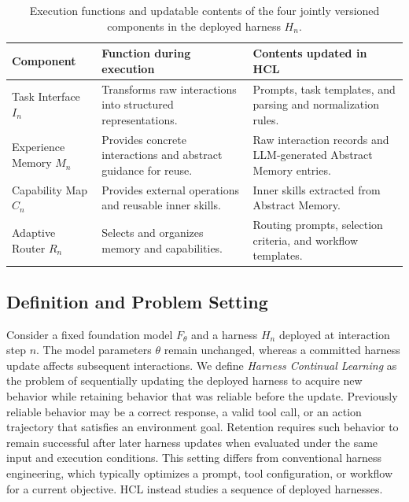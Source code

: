 \documentclass{article}
\begin{document}
\begin{table}[t]
\centering
\footnotesize
\caption{
Execution functions and updatable contents of the four jointly versioned
components in the deployed harness $H_n$.
}
\label{tab:hcl_state_overview}

\setlength{\tabcolsep}{3pt}
\renewcommand{\arraystretch}{0.98}

\begin{tabular}{
    >{\raggedright\arraybackslash}p{}
    >{\raggedright\arraybackslash}p{}
    >{\raggedright\arraybackslash}p{}
}
\toprule
Component
& Function during execution
& Contents updated in HCL \\
\midrule

Task Interface $I_n$
& Transforms raw interactions into structured representations.
& Prompts, task templates, and parsing and normalization rules. \\

\addlinespace[3pt]

Experience Memory $M_n$
& Provides concrete interactions and abstract guidance for reuse.
& Raw interaction records and LLM-generated Abstract Memory entries. \\

\addlinespace[3pt]

Capability Map $C_n$
& Provides external operations and reusable inner skills.
& Inner skills extracted from Abstract Memory. \\

\addlinespace[3pt]

Adaptive Router $R_n$
& Selects and organizes memory and capabilities.
& Routing prompts, selection criteria, and workflow templates. \\

\bottomrule
\end{tabular}
\end{table}

\subsection{Definition and Problem Setting}
\label{sec:problem_setting}


Consider a fixed foundation model $F_{\theta}$ and a harness $H_n$ deployed at
interaction step $n$. The model parameters $\theta$ remain unchanged, whereas
a committed harness update affects subsequent interactions. We define
\emph{Harness Continual Learning} as the problem of sequentially updating
the deployed harness to acquire new behavior while retaining behavior that was
reliable before the update. Previously reliable behavior may be a correct
response, a valid tool call, or an action trajectory that satisfies an
environment goal. Retention requires such behavior to remain successful after
later harness updates when evaluated under the same input and execution
conditions.
This setting differs from conventional harness engineering, which typically
optimizes a prompt, tool configuration, or workflow for a current objective.
HCL instead studies a sequence of deployed harnesses. 
\end{document}
